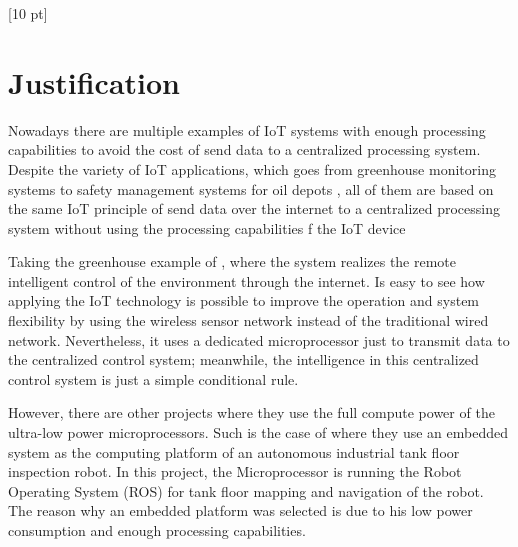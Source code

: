 \titleformat{\chapter}{\Huge\bfseries}{\thechapter}{0 pt}{\rule{340 pt}{3 pt}\\}
\titlespacing{\chapter}{100 pt}{-25 pt}{40 pt}[10 pt]	
\pagestyle{fancy}
\fancyhead[RO,RE]{\thepage}
\fancyfoot[CO,CE]{}

\chapter*{Justification}

\normalsize
\noindent

Nowadays there are multiple examples of IoT systems with enough processing
capabilities to avoid the cost of send data to a centralized processing system.
Despite the variety of IoT applications, which goes from greenhouse monitoring
systems \cite{DIU} to safety management systems for oil depots \cite{Du}, all
of them are based on the same IoT principle of send data over the internet to a
centralized processing system without using the processing capabilities f the
IoT device 

Taking the greenhouse example of \cite{Du}, where the system realizes the
remote intelligent control of the environment through the internet. Is easy to
see how applying the IoT technology is possible to improve the operation and
system flexibility by using the wireless sensor network instead of the
traditional wired network. Nevertheless, it uses a dedicated microprocessor
just to transmit data to the centralized control system; meanwhile, the
intelligence in this centralized control system is just a simple conditional
rule.

However, there are other projects where they  use the full compute power of the
ultra-low power microprocessors. Such is the case of \cite{Wun} where they use
an embedded system as the computing platform of an autonomous industrial tank
floor inspection robot. In this project, the Microprocessor is running the
Robot Operating System (ROS) for tank floor mapping and navigation of the
robot. The reason why an embedded platform was selected is due to his low power
consumption and enough processing capabilities. 

